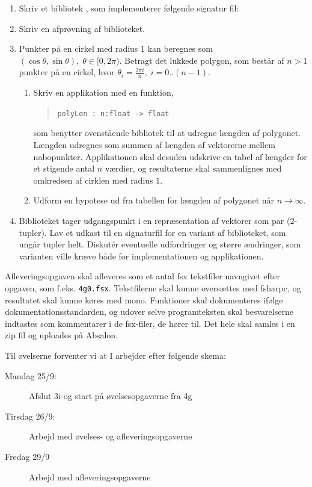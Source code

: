 \documentclass[a4paper,12pt]{article}
\begin{document}
\begin{enumerate}[label=4g.\arabic*,start=0]
\item Skriv et bibliotek , som implementerer følgende signatur fil:
\item Skriv en afprøvning af biblioteket.
\item Punkter på en cirkel med radius 1 kan beregnes som $(\cos \theta, \sin \theta), \;\theta\in [0,2\pi)$. Betragt det lukkede polygon, som består af $n>1$ punkter på en cirkel, hvor $\theta_i = \frac{2\pi i}{n},\; i = 0..(n-1)$. 
  \begin{enumerate}
  \item Skriv en applikation med en funktion,
  \begin{quote}
    \lstinline{polyLen : n:float -> float}
  \end{quote}
som benytter ovenstående bibliotek til at udregne længden af polygonet. Længden udregnes som summen af længden af vektorerne mellem nabopunkter. Applikationen skal desuden udskrive en tabel af længder for et stigende antal $n$ værdier, og resultaterne skal sammenlignes med omkredsen af cirklen med radius $1$. 
\item Udform en hypotese ud fra tabellen for længden af polygonet når $n\rightarrow\infty$.
  \end{enumerate}
\item Biblioteket  tager udgangspunkt i en repræsentation af vektorer som par (2-tupler). Lav et udkast til en signaturfil for en variant af biblioteket, som ungår tupler helt. Diskut\'{e}r eventuelle udfordringer og større ændringer, som varianten ville kræve både for implementationen og applikationen.
\end{enumerate}
Afleveringsopgaven skal afleveres som et antal fsx tekstfiler navngivet efter opgaven, som f.eks. \lstinline!4g0.fsx!. Tekstfilerne skal kunne oversættes med fsharpc, og resultatet skal kunne køres med mono. Funktioner skal dokumenteres ifølge dokumentationsstandarden, og udover selve programteksten skal besvarelserne indtastes som kommentarer i de fsx-filer, de hører til. Det hele skal samles i en zip fil og uploades på Absalon.

Til øvelserne forventer vi at I arbejder efter følgende skema:
\begin{description}
\item[Mandag 25/9:] Afslut 3i og start på øvelsesopgaverne fra 4g
\item[Tirsdag 26/9:] Arbejd med øvelses- og afleveringsopgaverne
\item[Fredag 29/9]  Arbejd med afleveringsopgaverne
\end{description}
\end{document}
